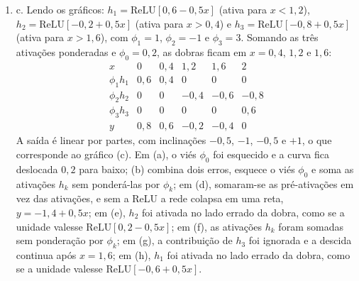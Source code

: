 \documentclass{dlproblemset}
\begin{document}
\begin{enumerate}[1)]
    \item c. Lendo os gráficos: $h_1 = \mathrm{ReLU}[0{,}6 - 0{,}5x]$ (ativa para $x < 1{,}2$), $h_2 = \mathrm{ReLU}[-0{,}2 + 0{,}5x]$ (ativa para $x > 0{,}4$) e $h_3 = \mathrm{ReLU}[-0{,}8 + 0{,}5x]$ (ativa para $x > 1{,}6$), com $\phi_1 = 1$, $\phi_2 = -1$ e $\phi_3 = 3$. Somando as três ativações ponderadas e $\phi_0 = 0{,}2$, as dobras ficam em $x = 0{,}4$, $1{,}2$ e $1{,}6$:
    \[
    \begin{array}{c|ccccc}
    x & 0 & 0{,}4 & 1{,}2 & 1{,}6 & 2 \\\hline
    \phi_1 h_1 & 0{,}6 & 0{,}4 & 0 & 0 & 0 \\
    \phi_2 h_2 & 0 & 0 & -0{,}4 & -0{,}6 & -0{,}8 \\
    \phi_3 h_3 & 0 & 0 & 0 & 0 & 0{,}6 \\\hline
    y & 0{,}8 & 0{,}6 & -0{,}2 & -0{,}4 & 0
    \end{array}
    \]
    A saída é linear por partes, com inclinações $-0{,}5$, $-1$, $-0{,}5$ e $+1$, o que corresponde ao gráfico (c). Em (a), o viés $\phi_0$ foi esquecido e a curva fica deslocada $0{,}2$ para baixo; (b) combina dois erros, esquece o viés $\phi_0$ e soma as ativações $h_k$ sem ponderá-las por $\phi_k$; em (d), somaram-se as pré-ativações em vez das ativações, e sem a ReLU a rede colapsa em uma reta, $y = -1{,}4 + 0{,}5x$; em (e), $h_2$ foi ativada no lado errado da dobra, como se a unidade valesse $\mathrm{ReLU}[0{,}2 - 0{,}5x]$; em (f), as ativações $h_k$ foram somadas sem ponderação por $\phi_k$; em (g), a contribuição de $h_3$ foi ignorada e a descida continua após $x = 1{,}6$; em (h), $h_1$ foi ativada no lado errado da dobra, como se a unidade valesse $\mathrm{ReLU}[-0{,}6 + 0{,}5x]$.


\end{enumerate}
\end{document}
